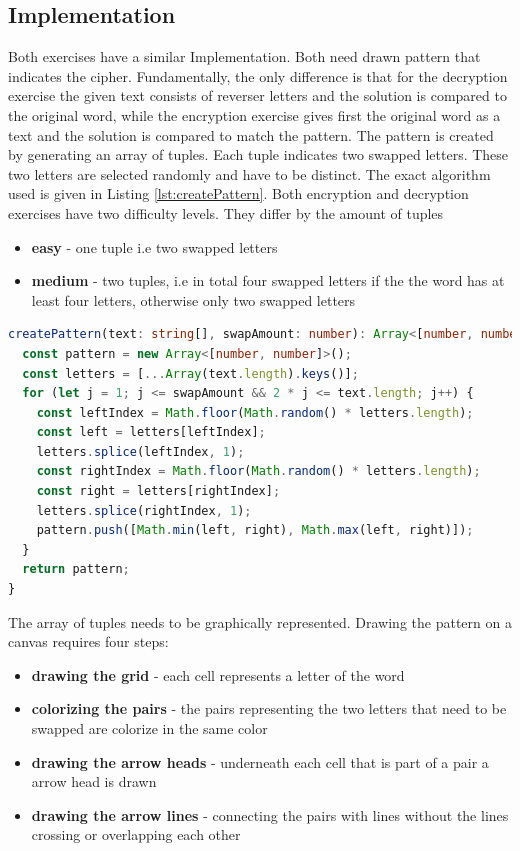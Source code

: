 \subsection{Implementation}

Both exercises have a similar Implementation. Both need drawn pattern that indicates the cipher. Fundamentally, the only difference is that for the decryption exercise the given text consists of reverser letters and the solution is compared to the original word, while the encryption exercise gives first the original word as a text and the solution is compared to match the pattern. 
The pattern is created by generating an array of tuples. Each tuple indicates two swapped letters. These two letters are selected randomly and have to be distinct. The exact algorithm used is given in Listing \ref{lst:createPattern}.
Both encryption and decryption exercises have two difficulty levels. They differ by the amount of tuples

\begin{itemize}
    \item \textbf{easy} - one tuple i.e two swapped letters 
    \item \textbf{medium} - two tuples, i.e in total four swapped letters if the the word has at least four letters, otherwise only two swapped letters 
\end{itemize}

\begin{lstlisting}[language=TypeScript,caption={Algorithm to generate an array of distinc tuples of given size},label={lst:createPattern}]
createPattern(text: string[], swapAmount: number): Array<[number, number]> {
  const pattern = new Array<[number, number]>();
  const letters = [...Array(text.length).keys()];
  for (let j = 1; j <= swapAmount && 2 * j <= text.length; j++) {
    const leftIndex = Math.floor(Math.random() * letters.length);
    const left = letters[leftIndex];
    letters.splice(leftIndex, 1);
    const rightIndex = Math.floor(Math.random() * letters.length);
    const right = letters[rightIndex];
    letters.splice(rightIndex, 1);
    pattern.push([Math.min(left, right), Math.max(left, right)]);
  }
  return pattern;
}
\end{lstlisting}

The array of tuples needs to be graphically represented. 
Drawing the pattern on a canvas requires four steps: 

\begin{itemize}
  \item \textbf{drawing the grid} - each cell represents a letter of the word
  \item \textbf{colorizing the pairs} - the pairs representing the two letters that need to be swapped are colorize in the same color
  \item \textbf{drawing the arrow heads} - underneath each cell that is part of a pair a arrow head is drawn
  \item \textbf{drawing the arrow lines} - connecting the pairs with lines without the lines crossing or overlapping each other
\end{itemize}

